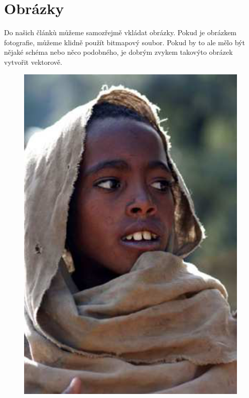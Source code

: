 \documentclass[11pt,a4paper]{article}
\begin{document}
\section{Obrázky}
Do našich článkù můžeme samozřejmě vkládat obrázky. Pokud je obrázkem fotografie,
můžeme klidně použít bitmapový soubor. Pokud by to ale mělo být nějaké schéma nebo
něco podobného, je dobrým zvykem takovýto obrázek vytvořit vektorově.
\begin{figure}[h]
    \centering
    \includegraphics[scale=0.4]{etiopan.eps}

\end{figure}
\end{document}
